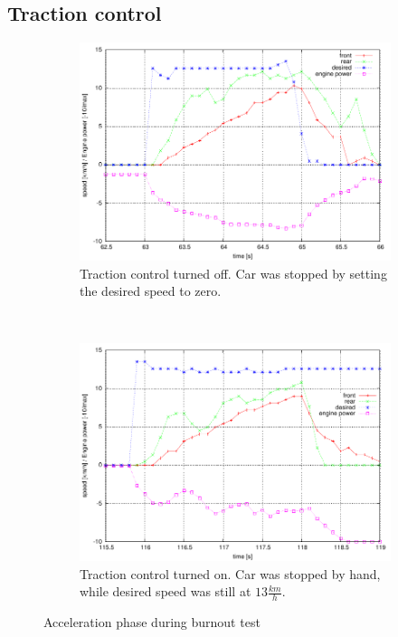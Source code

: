 \documentclass[a4paper
               ,10pt
               ,DIV=10 %
               ,BCOR=0.3cm
               ,pagesize %
               ,headings=small
               ,bibtotoc
               ]
               {scrartcl}
\begin{document}
\subsection{Traction control}
\begin{figure}[H]
  \centering
  \begin{subfigure}[b]{0.5\textwidth}
    \centering
    \includegraphics[width=\textwidth]{pic/plot_burnout/plot.pdf}
    \caption{Traction control turned off. Car was stopped by setting the desired speed to zero.}
		\label{figand1}
  \end{subfigure}~
  \begin{subfigure}[b]{0.5\textwidth}
    \centering
    \includegraphics[width=\textwidth]{pic/plot_burnout_asr/plot.pdf}
    \caption{Traction control turned on. Car was stopped by hand, while desired speed was still at $13 \frac{km}{h}$.}
		\label{figand2}
  \end{subfigure}
  \caption{Acceleration phase during burnout test}
\end{figure}
\end{document}
